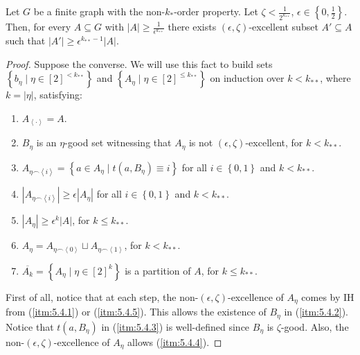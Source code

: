     \lemma[Claim 5.4]\label{existance_of_excellent_subsets}
        Let $G$ be a finite graph with the non-$k_{*}$-order property.
        Let $\zeta < \frac{1}{2^{k_{**}}}$, $\epsilon \in \left\{ 0, \frac{1}{2} \right\}$.
        Then, for every $A \subseteq G$ with $|A| \geq \frac{1}{\epsilon^{k_{**}}}$ there exists $(\epsilon, \zeta)$-excellent
        subset $A' \subseteq A$ such that $|A'| \geq \epsilon^{k_{**}-1} |A|$.
        \begin{proof}
            Suppose the converse.
            We will use this fact to build sets $\left\{ b_\eta \mid \eta \in [2]^{<k_{**}} \right\}$ and
            $\left\{ A_\eta \mid \eta \in [2]^{\leq k_{**}} \right\}$ on induction over $k<k_{**}$, where $k = |\eta|$,
            satisfying:
            \begin{enumerate}
                \item\label{itm:5.4.1} $A_{\left< \cdot \right>} = A$.
                \item\label{itm:5.4.2} $B_\eta$ is an $\eta$-good set witnessing that $A_\eta$ is not
                    $(\epsilon, \zeta)$-excellent, for $k < k_{**}$.
                \item\label{itm:5.4.3} $A_{\eta \frown \left< i \right>} = \left\{ a \in A_\eta \mid t(a, B_\eta) \equiv i \right\}$
                    for all $i \in \left\{ 0,1 \right\}$ and $k < k_{**}$.
                \item\label{itm:5.4.4} $|A_{\eta \frown \left< i \right>}| \geq \epsilon |A_\eta|$
                    for all $i \in \left\{ 0,1 \right\}$ and $k < k_{**}$.
                \item\label{itm:5.4.5} $|A_\eta| \geq \epsilon^k |A|$, for $k \leq k_{**}$.
                \item\label{itm:5.4.6} $A_\eta = A_{\eta \frown \left< 0 \right>} \sqcup A_{\eta \frown \left< 1 \right>}$,
                    for $k < k_{**}$.
                \item\label{itm:5.4.7} $\overline{A_k} = \left\{ A_\eta \mid \eta \in [2]^k \right\}$ is a partition of $A$,
                    for $k \leq k_{**}$.
            \end{enumerate}
            First of all, notice that at each step, the non-$(\epsilon, \zeta)$-excellence of $A_\eta$ comes by IH
            from (\ref{itm:5.4.1}) or (\ref{itm:5.4.5}).
            This allows the existence of $B_\eta$ in (\ref{itm:5.4.2}).
            Notice that $t(a, B_\eta)$ in (\ref{itm:5.4.3}) is well-defined since $B_\eta$ is $\zeta$-good.
            Also, the non-$(\epsilon, \zeta)$-excellence of $A_\eta$ allows (\ref{itm:5.4.4}).

\end{proof}
